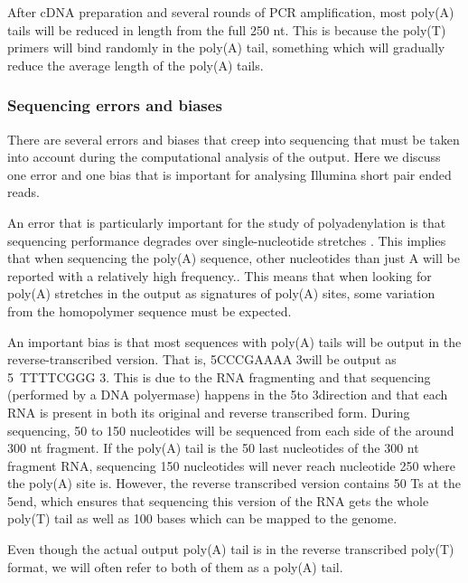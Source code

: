 After cDNA preparation and several rounds of PCR amplification, most poly(A)
tails will be reduced in length from the full 250 nt. This is because the
poly(T) primers will bind randomly in the poly(A) tail, something which will
gradually reduce the average length of the poly(A) tails.

\subsubsection{Sequencing errors and biases}
There are several errors and biases that creep into sequencing that must be
taken into account during the computational analysis of the output. Here we
discuss one error and one bias that is important for analysing Illumina short
pair ended reads.

An error that is particularly important for the study of polyadenylation is
that sequencing performance degrades over single-nucleotide stretches
\cite{minoche_evaluation_2011}. This implies that when sequencing the poly(A)
sequence, other nucleotides than just A will be reported with a relatively high
frequency.. This means that when looking for poly(A) stretches in the output as
signatures of poly(A) sites, some variation from the homopolymer sequence must
be expected.

An important bias is that most sequences with poly(A) tails will be output in
the reverse-transcribed version. That is, 5\p CCCGAAAA 3\p will be output as 5\
TTTTCGGG 3\p. This is due to the RNA fragmenting and that sequencing
(performed by a DNA polyermase) happens in the 5\p to 3\p direction and that
each RNA is present in both its original and reverse transcribed form. During
sequencing, 50 to 150 nucleotides will be sequenced from each side of the around
300 nt fragment. If the poly(A) tail is the 50 last nucleotides of the 300 nt
fragment RNA, sequencing 150 nucleotides will never reach nucleotide 250 where
the poly(A) site is. However, the reverse transcribed version contains 50 Ts at
the 5\p end, which ensures that sequencing this version of the RNA gets the
whole poly(T) tail as well as 100 bases which can be mapped to the genome.

Even though the actual output poly(A) tail is in the reverse transcribed
poly(T) format, we will often refer to both of them as a poly(A) tail.




